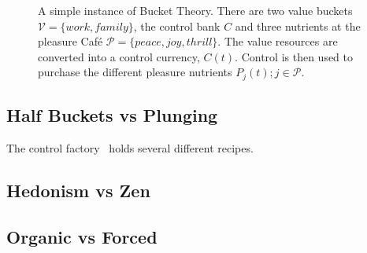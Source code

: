 \documentclass{article}
\begin{document}
\begin{figure}
\caption{A simple instance of Bucket Theory. There are two value buckets $\mathcal{V}=\{work,family\}$, the control bank $C$ and three nutrients at the pleasure Caf\'e $\mathcal{P}=\{peace, joy, thrill\}$.  The value resources are converted into a control currency, $C(t)$. Control is then used to purchase the different pleasure nutrients $P_j(t) ; j\in \mathcal{P}$. }
\label{fig:pleasure}
\end{figure}

\subsection{Half Buckets vs Plunging}
The control factory~\cite{Bucket2014} holds several different recipes.


\subsection{Hedonism vs Zen}

\subsection{Organic vs Forced}
\end{document}
